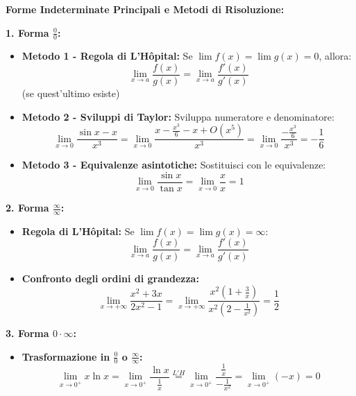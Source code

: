 \begin{info}
\textbf{Forme Indeterminate Principali e Metodi di Risoluzione:}

\textbf{1. Forma $\frac{0}{0}$:}
\begin{itemize}
    \item \textbf{Metodo 1 - Regola di L'Hôpital:} Se $\lim f(x) = \lim g(x) = 0$, allora:
    \[ \lim_{x \to a} \frac{f(x)}{g(x)} = \lim_{x \to a} \frac{f'(x)}{g'(x)} \]
    (se quest'ultimo esiste)
    
    \item \textbf{Metodo 2 - Sviluppi di Taylor:} Sviluppa numeratore e denominatore:
    \[ \lim_{x \to 0} \frac{\sin x - x}{x^3} = \lim_{x \to 0} \frac{x - \frac{x^3}{6} - x + O(x^5)}{x^3} = \lim_{x \to 0} \frac{-\frac{x^3}{6}}{x^3} = -\frac{1}{6} \]
    
    \item \textbf{Metodo 3 - Equivalenze asintotiche:} Sostituisci con le equivalenze:
    \[ \lim_{x \to 0} \frac{\sin x}{\tan x} = \lim_{x \to 0} \frac{x}{x} = 1 \]
\end{itemize}

\textbf{2. Forma $\frac{\infty}{\infty}$:}
\begin{itemize}
    \item \textbf{Regola di L'Hôpital:} Se $\lim f(x) = \lim g(x) = \infty$:
    \[ \lim_{x \to a} \frac{f(x)}{g(x)} = \lim_{x \to a} \frac{f'(x)}{g'(x)} \]
    
    \item \textbf{Confronto degli ordini di grandezza:}
    \[ \lim_{x \to +\infty} \frac{x^2 + 3x}{2x^2 - 1} = \lim_{x \to +\infty} \frac{x^2(1 + \frac{3}{x})}{x^2(2 - \frac{1}{x^2})} = \frac{1}{2} \]
\end{itemize}

\textbf{3. Forma $0 \cdot \infty$:}
\begin{itemize}
    \item \textbf{Trasformazione in $\frac{0}{0}$ o $\frac{\infty}{\infty}$:}
    \[ \lim_{x \to 0^+} x \ln x = \lim_{x \to 0^+} \frac{\ln x}{\frac{1}{x}} \stackrel{L'H}{=} \lim_{x \to 0^+} \frac{\frac{1}{x}}{-\frac{1}{x^2}} = \lim_{x \to 0^+} (-x) = 0 \]
\end{itemize}
\end{info}
